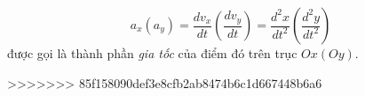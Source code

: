     \begin{definition}
        \begin{equation}
            a_{x}(a_y)=\frac{dv_x}{dt}\left(\frac{dv_y}{dt}\right)=\frac{d^2x}{dt^2}\left(\frac{d^2y}{dt^2}\right)
        \end{equation}
    được gọi là thành phần \emph{gia tốc} của điểm đó trên trục $Ox(Oy)$.
    \end{definition}
    
>>>>>>> 85f158090def3e8cfb2ab8474b6c1d667448b6a6
